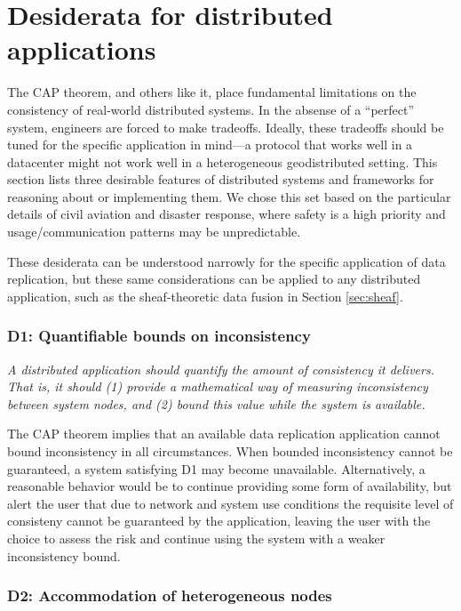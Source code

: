 \section{Desiderata for distributed applications}
\label{sec:des}

The CAP theorem, and others like it, place fundamental limitations on
the consistency of real-world distributed systems. In the absense of a
``perfect'' system, engineers are forced to make tradeoffs. Ideally,
these tradeoffs should be tuned for the specific application in
mind---a protocol that works well in a datacenter might not work well
in a heterogeneous geodistributed setting. This section lists three
desirable features of distributed systems and frameworks for reasoning
about or implementing them. We chose this set based on the particular
details of civil aviation and disaster response, where safety is a
high priority and usage/communication patterns may be
unpredictable.

These desiderata can be understood narrowly for the specific
application of data replication, but these same considerations can be
applied to any distributed application, such as the sheaf-theoretic
data fusion in Section \ref{sec:sheaf}.

\subsubsection*{D1: Quantifiable bounds on inconsistency}

\emph{A distributed application should quantify the amount of
consistency it delivers. That is, it should (1) provide a mathematical
way of measuring inconsistency between system nodes, and (2) bound
this value while the system is available.}

The CAP theorem implies that an available data replication application
cannot bound inconsistency in all circumstances. When bounded
inconsistency cannot be guaranteed, a system satisfying D1 may become
unavailable. Alternatively, a reasonable behavior would be to continue
providing some form of availability, but alert the user that due to
network and system use conditions the requisite level of consisteny
cannot be guaranteed by the application, leaving the user with the
choice to assess the risk and continue using the system with a weaker
inconsistency bound.

\subsubsection*{D2: Accommodation of heterogeneous nodes}

